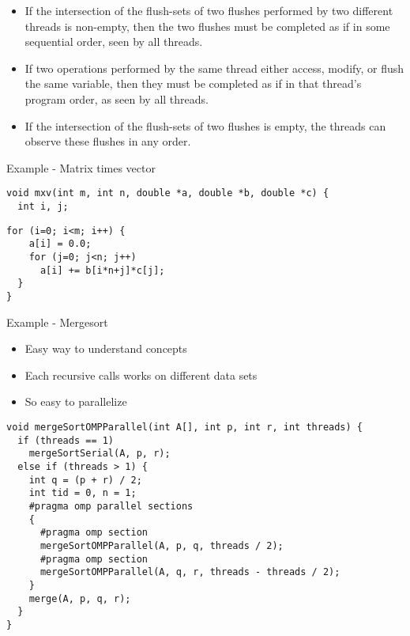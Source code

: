 \documentclass[10pt]{beamer}
\begin{document}
\begin{frame}{ }
\begin{itemize}
\item If the intersection of the flush-sets of two flushes performed by two
different threads is non-empty, then the two flushes must be completed as if
in some sequential order, seen by all threads.
\item If two operations performed by the same thread either access, modify, or
flush the same variable, then they must be completed as if in that thread's
program order, as seen by all threads.
\item If the intersection of the flush-sets of two flushes is empty, the
threads can observe these flushes in any order.
\end{itemize}
\end{frame}

\begin{frame}[fragile]{Example - Matrix times vector}
\begin{Verbatim}[fontsize=\small, formatcom=\color{red}]
void mxv(int m, int n, double *a, double *b, double *c) {
  int i, j;
\end{Verbatim}
\begin{Verbatim}[fontsize=\small, formatcom=\color{red}]
  for (i=0; i<m; i++) {
    a[i] = 0.0;
    for (j=0; j<n; j++)
      a[i] += b[i*n+j]*c[j];
  }
}
\end{Verbatim}
\end{frame}

\begin{frame}[fragile]{Example - Mergesort}
\begin{itemize}
\item Easy way to understand concepts
\item Each recursive calls works on different data sets
\item So easy to parallelize
\end{itemize}
\begin{Verbatim}[frame=single, fontsize=\small, formatcom=\color{red}]
void mergeSortOMPParallel(int A[], int p, int r, int threads) {
  if (threads == 1)
    mergeSortSerial(A, p, r);
  else if (threads > 1) {
    int q = (p + r) / 2;
    int tid = 0, n = 1;
    #pragma omp parallel sections
    {
      #pragma omp section
      mergeSortOMPParallel(A, p, q, threads / 2);
      #pragma omp section
      mergeSortOMPParallel(A, q, r, threads - threads / 2);
    }
    merge(A, p, q, r);
  }
}
\end{Verbatim}
\end{frame}
\end{document}
